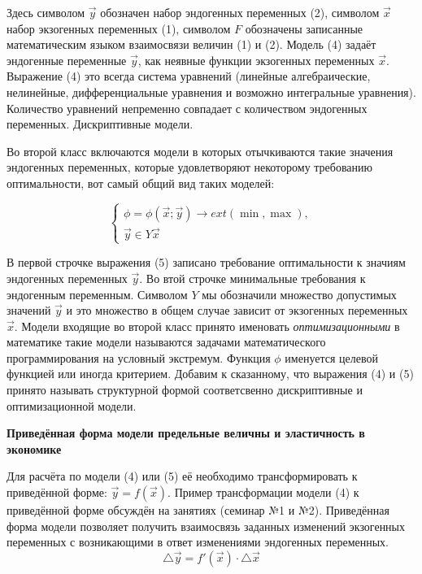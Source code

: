 \documentclass[12pt,a4paper]{article}
\begin{document}
Здесь символом $\vec{y}$ обозначен набор эндогенных переменных (2), символом $\vec{x}$ набор экзогенных переменных (1), символом $F$ обозначены записанные математическим языком взаимосвязи величин (1) и (2). Модель (4) задаёт эндогенные переменные $\vec{y}$, как неявные функции экзогенных переменных $\vec{x}$. Выражение (4) это всегда система уравнений (линейные алгебраические, нелинейные, дифференциальные уравнения и возможно интегральные уравнения). Количество уравнений непременно совпадает с количеством эндогенных переменных. Дискриптивные модели.

Во второй класс включаются модели в которых отычкиваются такие значения эндогенных переменных, которые удовлетворяют некоторому требованию оптимальности, вот самый общий вид таких моделей:

\begin{equation}
\begin{cases}
\phi = \phi(\vec{x};\vec{y}) \rightarrow ext (\min, \max),\\
\vec{y} \in Y{\vec{x}}
\end{cases}
\end{equation}

В первой строчке выражения (5) записано требование оптимальности к значиям эндогенных переменных $\vec{y}$. Во втой строчке минимальные требования к эндогенным переменным. Символом $Y$ мы обозначили множество допустимых значений $\vec{y}$ и это множество в общем случае зависит от экзогенных переменных $\vec{x}$. Модели входящие во второй класс принято именовать \textit{оптимизационными} в математике такие модели называются задачами математического программирования на условный экстремум. Функция $\phi$ именуется целевой функцией или иногда критерием. Добавим к сказанному, что выражения (4) и (5) принято называть структурной формой соответсвенно дискриптивные и оптимизационной модели. 

\begin{center}
\textbf{Приведённая форма модели предельные величны и эластичность в экономике}
\end{center}

Для расчёта по модели (4) или (5) её необходимо трансформировать к приведённой форме: $\vec{y} = f(\vec{x})$. Пример трансформации модели (4) к приведённой форме обсуждён на занятиях (семинар №1 и №2). Приведённая форма модели позволяет получить взаимосвязь заданных изменений экзогенных переменных с возникающими в ответ изменениями эндогенных переменных. 
\begin{equation}
\triangle \vec{y} = f'(\vec{x}) \cdot \triangle \vec{x}
\end{equation}
\end{document}
